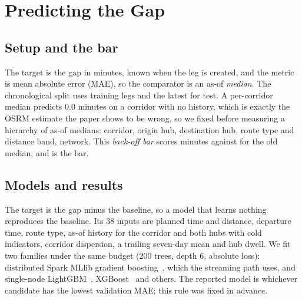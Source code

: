 \documentclass[pdflatex,sn-basic]{sn-jnl}
\begin{document}
\section{Predicting the Gap}\label{sec:prediction}
\subsection{Setup and the bar}
The target is the gap in minutes, known when the leg is created, and the metric is mean absolute error (MAE), so the comparator is an as-of \emph{median}. The chronological split uses \fzSplitTrain{} training legs and the latest \fzSplitTest{} for test. A per-corridor median predicts 0.0 minutes on a corridor with no history, which is exactly the OSRM estimate the paper shows to be wrong, so we fixed before measuring a hierarchy of as-of medians: corridor, origin hub, destination hub, route type and distance band, network. This \emph{back-off bar} scores \fzBarBackoffMaeDpTwo{} minutes against \fzBarOldMedianMaeDpTwo{} for the old median, and is the bar.

\subsection{Models and results}
The target is the gap minus the baseline, so a model that learns nothing reproduces the baseline. Its 38 inputs are planned time and distance, departure time, route type, as-of history for the corridor and both hubs with cold indicators, corridor dispersion, a trailing seven-day mean and hub dwell. We fit two families under the same budget (200 trees, depth 6, absolute loss): distributed Spark MLlib gradient boosting~\cite{friedman2001greedy,meng2016mllib}, which the streaming path uses, and single-node LightGBM~\cite{ke2017lightgbm}, XGBoost~\cite{chen2016xgboost} and others. The reported model is whichever candidate has the lowest validation MAE; this rule was fixed in advance.
\end{document}
